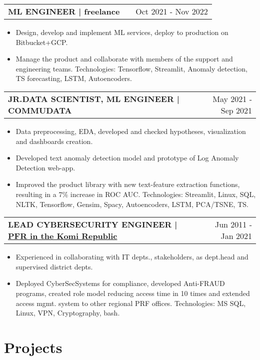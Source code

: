 \documentclass[a4paper,12pt]{article}
\makeatletter
\newenvironment{joblong}[2]
    {
    \begin{tabularx}{\linewidth}{@{}l X r@{}}
    \textbf{#1} & \hfill &  #2 \\[3.75pt]
    \end{tabularx}
    \begin{minipage}[t]{\linewidth}
    \begin{itemize}[nosep,after=\strut, leftmargin=1em, itemsep=3pt,label=--]
    }
    {
    \end{itemize}
    \end{minipage}    
    }
\makeatother
\begin{document}
\begin{joblong}{ML ENGINEER | freelance}{Oct 2021 - Nov 2022}
\item Design, develop and implement ML services, deploy to production on Bitbucket+GCP.
\item Manage the product and collaborate with members of the support and engineering teams.
\footnotesize Technologies: Tensorflow, Streamlit, Anomaly detection, TS forecasting, LSTM, Autoencoders. \\
\end{joblong}

\begin{joblong}{JR.DATA SCIENTIST, ML ENGINEER | COMMUDATA}{May 2021 - Sep 2021}
\footnotesize NLP Startup. The idea was - determine an author's psychological state from his texts.\\
\item Data preprocessing, EDA, developed and checked hypotheses, visualization and dashboards creation.
\item Developed text anomaly detection model and prototype of Log Anomaly Detection web-app.
\item Improved the product library with new text-feature extraction functions,
resulting in a 7\% increase in ROC AUC.
\footnotesize Technologies: Streamlit, Linux, SQL, NLTK, Tensorflow, Gensim, Spacy, Autoencoders, LSTM, PCA/TSNE, TS.\\
\end{joblong}

\begin{joblong}{LEAD CYBERSECURITY ENGINEER | \href{www.pfrf.ru/ot_komi/}{PFR in the Komi Republic}}{Jun 2011 - Jan 2021}
\footnotesize Regional dept. Pension Fund of Russia (160+ employees in regional HQ, 22 district branches.\\
\item Experienced in collaborating with IT depts., stakeholders, as dept.head and supervised district depts.
\item Deployed CyberSecSystems for compliance, developed Anti-FRAUD programs, created role model reducing access time in 10 times and extended access mgmt. system to other regional PRF offices.
\footnotesize Technologies: MS SQL, Linux, VPN, Cryptography, bash.\\
\end{joblong}


\section{Projects}
\end{document}
